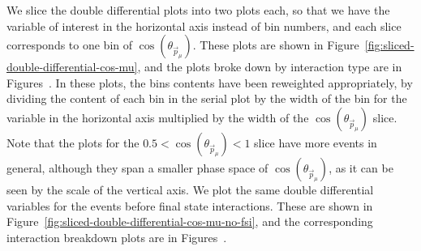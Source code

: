 \documentclass{article}
\begin{document}
We slice the double differential plots into two plots each, so that we have the variable of interest in the horizontal axis instead of bin numbers,
and each slice corresponds to one bin of $\cos(\theta_{\vec{p}_{\mu}})$.
These plots are shown in Figure~\ref{fig:sliced-double-differential-cos-mu}, and the plots broke down by interaction type are in 
Figures~.
In these plots, the bins contents have been reweighted 
appropriately, by dividing the content of each bin in the serial plot by the width of the bin for the variable in the horizontal axis
multiplied by the width of the $\cos(\theta_{\vec{p}_{\mu}})$ slice.
Note that the plots for the $0.5 < \cos(\theta_{\vec{p}_{\mu}}) < 1$ slice have more events in general, although they span a smaller phase space 
of $\cos(\theta_{\vec{p}_{\mu}})$, as it can be seen by the scale of the vertical axis.
We plot the same double differential variables for the events before final state interactions. 
These are shown in Figure~\ref{fig:sliced-double-differential-cos-mu-no-fsi}, and the corresponding interaction 
breakdown plots are in Figures~.
\end{document}
